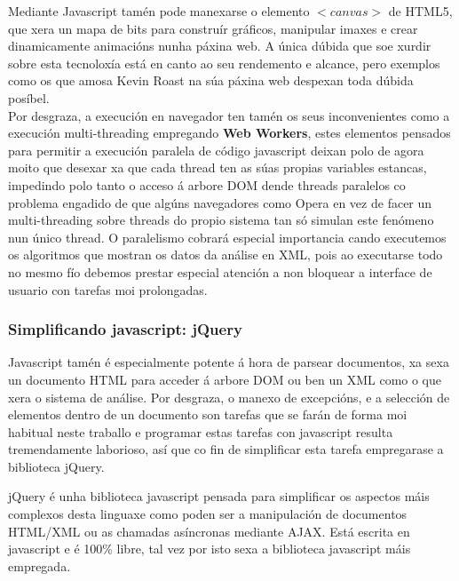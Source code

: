         Mediante Javascript tamén pode manexarse o elemento $<canvas>$ de HTML5, que xera un mapa
        de bits para construír gráficos, manipular imaxes e crear dinamicamente animacións nunha
        páxina web. A única dúbida que soe xurdir sobre esta tecnoloxía está en canto ao seu 
        rendemento e alcance, pero exemplos como os que amosa Kevin Roast na súa páxina 
        web\cite{kevin-roast-canvas-examples} despexan toda dúbida posíbel.\\
        
        Por desgraza, a execución en navegador ten tamén os seus inconvenientes como a execución 
        multi-threading empregando \textbf{Web Workers}, estes elementos pensados para permitir
        a execución paralela de código javascript deixan polo de agora moito que desexar xa que 
        cada thread ten as súas propias variables estancas, impedindo polo tanto o acceso á 
        arbore DOM dende threads paralelos co problema engadido de que algúns navegadores como 
        Opera en vez de facer un multi-threading sobre threads do propio sistema  tan só simulan
        este fenómeno nun único thread. O paralelismo cobrará especial importancia 
        cando executemos os algoritmos que mostran os datos da análise en XML, pois ao 
        executarse todo no mesmo fío debemos prestar especial atención a non bloquear a 
        interface de usuario con tarefas moi prolongadas.\\
    
        \subsubsection{Simplificando javascript: jQuery}
    
            Javascript tamén é especialmente potente á hora de parsear documentos, xa sexa
            un documento HTML para acceder á arbore DOM ou ben un XML como o que xera o sistema de 
            análise. Por desgraza, o manexo de excepcións, e a selección de elementos dentro de un 
            documento son tarefas que se farán de forma moi habitual neste traballo e programar 
            estas tarefas con javascript resulta tremendamente laborioso, así que co fin de 
            simplificar esta tarefa empregarase a biblioteca jQuery.
                
            jQuery é unha biblioteca javascript pensada para simplificar os aspectos máis complexos desta 
            linguaxe como poden ser a manipulación de documentos HTML/XML ou as chamadas asíncronas 
            mediante AJAX. Está escrita en javascript e é 100\% libre, tal vez por isto sexa a biblioteca
            javascript máis empregada.
            
